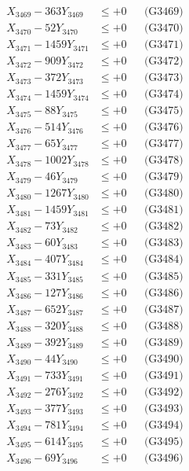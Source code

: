 \documentclass[a4paper,10pt]{article}
\begin{document}
{\begin{align}
X_{3469} - 363Y_{3469} &\leq +0 && \text{(G3469)} \\
X_{3470} - 52Y_{3470} &\leq +0 && \text{(G3470)} \\
\allowbreak
X_{3471} - 1459Y_{3471} &\leq +0 && \text{(G3471)} \\
X_{3472} - 909Y_{3472} &\leq +0 && \text{(G3472)} \\
X_{3473} - 372Y_{3473} &\leq +0 && \text{(G3473)} \\
X_{3474} - 1459Y_{3474} &\leq +0 && \text{(G3474)} \\
X_{3475} - 88Y_{3475} &\leq +0 && \text{(G3475)} \\
X_{3476} - 514Y_{3476} &\leq +0 && \text{(G3476)} \\
X_{3477} - 65Y_{3477} &\leq +0 && \text{(G3477)} \\
X_{3478} - 1002Y_{3478} &\leq +0 && \text{(G3478)} \\
X_{3479} - 46Y_{3479} &\leq +0 && \text{(G3479)} \\
X_{3480} - 1267Y_{3480} &\leq +0 && \text{(G3480)} \\
\allowbreak
X_{3481} - 1459Y_{3481} &\leq +0 && \text{(G3481)} \\
X_{3482} - 73Y_{3482} &\leq +0 && \text{(G3482)} \\
X_{3483} - 60Y_{3483} &\leq +0 && \text{(G3483)} \\
X_{3484} - 407Y_{3484} &\leq +0 && \text{(G3484)} \\
X_{3485} - 331Y_{3485} &\leq +0 && \text{(G3485)} \\
X_{3486} - 127Y_{3486} &\leq +0 && \text{(G3486)} \\
X_{3487} - 652Y_{3487} &\leq +0 && \text{(G3487)} \\
X_{3488} - 320Y_{3488} &\leq +0 && \text{(G3488)} \\
X_{3489} - 392Y_{3489} &\leq +0 && \text{(G3489)} \\
X_{3490} - 44Y_{3490} &\leq +0 && \text{(G3490)} \\
\allowbreak
X_{3491} - 733Y_{3491} &\leq +0 && \text{(G3491)} \\
X_{3492} - 276Y_{3492} &\leq +0 && \text{(G3492)} \\
X_{3493} - 377Y_{3493} &\leq +0 && \text{(G3493)} \\
X_{3494} - 781Y_{3494} &\leq +0 && \text{(G3494)} \\
X_{3495} - 614Y_{3495} &\leq +0 && \text{(G3495)} \\
X_{3496} - 69Y_{3496} &\leq +0 && \text{(G3496)} \\

\end{align}}
\end{document}

